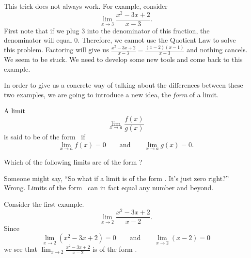 \documentclass{ximera}
\begin{document}
This trick does not always work.  For example, consider
\[
\lim_{x\to 3}\frac{x^2-3x+2}{x-3}.
\]
First note that if we plug $3$ into the denominator of this fraction,
the denominator will equal $0$.  Therefore, we cannot use the Quotient
Law to solve this problem.  Factoring will give us
$\frac{x^2-3x+2}{x-3}=\frac{(x-2)(x-1)}{x-3}$ and nothing cancels.  We
seem to be stuck.  We need to develop some new tools and come back to
this example.

In order to give us a concrete way of talking about the differences
between these two examples, we are going to introduce a new idea, the
\textit{form} of a limit.

\begin{definition}
  A limit
  \[
  \lim_{x\to a} \frac{f(x)}{g(x)}
  \]
  is said to be of the form \zeroOverZero\ if
  \[
  \lim_{x\to a} f(x) = 0\qquad\text{and}\qquad \lim_{x\to a} g(x) =0.
  \]
\end{definition}

\begin{question}
  Which of the following limits are of the form \zeroOverZero?
  \begin{multipleChoice}
  \end{multipleChoice}
\end{question}

Someone might say, ``So what if a limit is of the form
\zeroOverZero. It's just zero right?'' Wrong. Limits of the form
\zeroOverZero\ can in fact equal any number and beyond.


Consider the first example.
\[
\lim_{x\to 2}\frac{x^2-3x+2}{x-2}.
\]
Since
\[
\lim_{x\to 2}\left(x^2-3x+2\right) = 0\qquad\text{and}\qquad \lim_{x\to
  2}\left(x-2\right) = 0
\]
we see that $\lim_{x\to 2}\frac{x^2-3x+2}{x-2}$ is of the form
\zeroOverZero.
\end{document}
